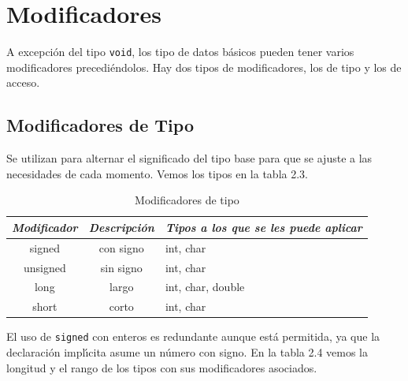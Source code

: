 \section{Modificadores}

A excepci\'on del tipo \texttt{void}, los tipo de datos b\'asicos pueden tener
varios modificadores precedi\'endolos. Hay dos tipos de modificadores, los de
tipo y los de acceso.

\subsection{Modificadores de Tipo}

Se utilizan para alternar el significado del tipo base para que se ajuste a 
las necesidades de cada momento. Vemos los tipos en la tabla 2.3.


\begin{table}[!hbp]
\begin{tabular}{|c|c|p{2in}|} \hline
\em Modificador & \em Descripci\'on & \em Tipos a los que se les puede aplicar\\ \hline
signed & con signo & int, char\\ \hline
unsigned & sin signo & int, char\\\hline
long & largo & int, char, double\\\hline
short & corto & int, char\\ \hline
\end{tabular}
\caption{Modificadores de tipo}
\end{table}

El uso de \texttt{signed} con enteros es redundante aunque est\'a permitida, ya
que  la declaraci\'on impl\'{\i}cita asume un n\'umero con signo. En la tabla
2.4 vemos la longitud y el rango de los tipos con sus modificadores asociados.

